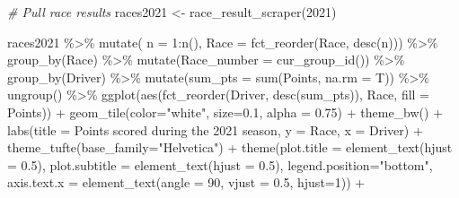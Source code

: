 \documentclass[
]{book}
\newenvironment{Shaded}{\begin{snugshade}}{\end{snugshade}}
\newcommand{\AttributeTok}[1]{\textcolor[rgb]{0.77,0.63,0.00}{#1}}
\newcommand{\CommentTok}[1]{\textcolor[rgb]{0.56,0.35,0.01}{\textit{#1}}}
\newcommand{\DecValTok}[1]{\textcolor[rgb]{0.00,0.00,0.81}{#1}}
\newcommand{\FloatTok}[1]{\textcolor[rgb]{0.00,0.00,0.81}{#1}}
\newcommand{\FunctionTok}[1]{\textcolor[rgb]{0.00,0.00,0.00}{#1}}
\newcommand{\NormalTok}[1]{#1}
\newcommand{\OtherTok}[1]{\textcolor[rgb]{0.56,0.35,0.01}{#1}}
\newcommand{\SpecialCharTok}[1]{\textcolor[rgb]{0.00,0.00,0.00}{#1}}
\newcommand{\StringTok}[1]{\textcolor[rgb]{0.31,0.60,0.02}{#1}}
\begin{document}
\begin{Shaded}
\begin{Highlighting}[]
\CommentTok{\# Pull race results}
\NormalTok{races2021 }\OtherTok{\textless{}{-}} \FunctionTok{race\_result\_scraper}\NormalTok{(}\DecValTok{2021}\NormalTok{)}

\NormalTok{races2021 }\SpecialCharTok{\%\textgreater{}\%}
  \FunctionTok{mutate}\NormalTok{( }\AttributeTok{n =} \DecValTok{1}\SpecialCharTok{:}\FunctionTok{n}\NormalTok{(),}
          \AttributeTok{Race =} \FunctionTok{fct\_reorder}\NormalTok{(Race, }\FunctionTok{desc}\NormalTok{(n))) }\SpecialCharTok{\%\textgreater{}\%}
  \FunctionTok{group\_by}\NormalTok{(Race) }\SpecialCharTok{\%\textgreater{}\%} 
  \FunctionTok{mutate}\NormalTok{(}\AttributeTok{Race\_number =} \FunctionTok{cur\_group\_id}\NormalTok{()) }\SpecialCharTok{\%\textgreater{}\%}
  \FunctionTok{group\_by}\NormalTok{(Driver) }\SpecialCharTok{\%\textgreater{}\%} 
  \FunctionTok{mutate}\NormalTok{(}\AttributeTok{sum\_pts =} \FunctionTok{sum}\NormalTok{(Points, }\AttributeTok{na.rm =}\NormalTok{ T)) }\SpecialCharTok{\%\textgreater{}\%}
  \FunctionTok{ungroup}\NormalTok{() }\SpecialCharTok{\%\textgreater{}\%} 
  \FunctionTok{ggplot}\NormalTok{(}\FunctionTok{aes}\NormalTok{(}\FunctionTok{fct\_reorder}\NormalTok{(Driver, }\FunctionTok{desc}\NormalTok{(sum\_pts)), Race, }\AttributeTok{fill =}\NormalTok{ Points)) }\SpecialCharTok{+}
  \FunctionTok{geom\_tile}\NormalTok{(}\AttributeTok{color=}\StringTok{"white"}\NormalTok{, }\AttributeTok{size=}\FloatTok{0.1}\NormalTok{, }\AttributeTok{alpha =} \FloatTok{0.75}\NormalTok{) }\SpecialCharTok{+}
  \FunctionTok{theme\_bw}\NormalTok{() }\SpecialCharTok{+}
  \FunctionTok{labs}\NormalTok{(}\AttributeTok{title =} \StringTok{\textquotesingle{}Points scored during the 2021 season\textquotesingle{}}\NormalTok{,}
       \AttributeTok{y =} \StringTok{\textquotesingle{}Race\textquotesingle{}}\NormalTok{,}
       \AttributeTok{x =} \StringTok{\textquotesingle{}Driver\textquotesingle{}}\NormalTok{) }\SpecialCharTok{+} 
  \FunctionTok{theme\_tufte}\NormalTok{(}\AttributeTok{base\_family=}\StringTok{"Helvetica"}\NormalTok{)  }\SpecialCharTok{+}
  \FunctionTok{theme}\NormalTok{(}\AttributeTok{plot.title =} \FunctionTok{element\_text}\NormalTok{(}\AttributeTok{hjust =} \FloatTok{0.5}\NormalTok{),}
        \AttributeTok{plot.subtitle =} \FunctionTok{element\_text}\NormalTok{(}\AttributeTok{hjust =} \FloatTok{0.5}\NormalTok{),}
        \AttributeTok{legend.position=}\StringTok{"bottom"}\NormalTok{,}
        \AttributeTok{axis.text.x =} \FunctionTok{element\_text}\NormalTok{(}\AttributeTok{angle =} \DecValTok{90}\NormalTok{, }\AttributeTok{vjust =} \FloatTok{0.5}\NormalTok{, }\AttributeTok{hjust=}\DecValTok{1}\NormalTok{)) }\SpecialCharTok{+}

\end{Highlighting}
\end{Shaded}
\end{document}
